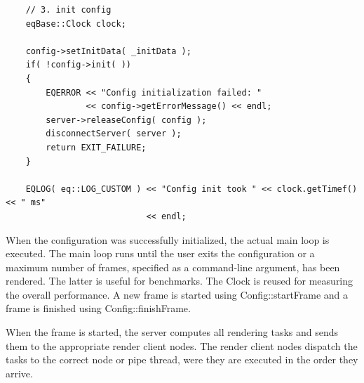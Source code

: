 \documentclass[10pt,a4]{scrartcl}
\begin{document}
{\footnotesize\begin{lstlisting}
    // 3. init config
    eqBase::Clock clock;

    config->setInitData( _initData );
    if( !config->init( ))
    {
        EQERROR << "Config initialization failed: " 
                << config->getErrorMessage() << endl;
        server->releaseConfig( config );
        disconnectServer( server );
        return EXIT_FAILURE;
    }

    EQLOG( eq::LOG_CUSTOM ) << "Config init took " << clock.getTimef() << " ms"
                            << endl;
\end{lstlisting}}%

When the configuration was successfully initialized, the actual main
loop is executed. The main loop runs until the user exits the
configuration or a maximum number of frames, specified as a command-line
argument, has been rendered. The latter is useful for benchmarks. The
\textsf{Clock} is reused for measuring the overall performance. A new
frame is started using \textsf{Config::startFrame} and a frame is
finished using \textsf{Config::finishFrame}.

When the frame is started, the server computes all rendering tasks and
sends them to the appropriate render client nodes. The render client
nodes dispatch the tasks to the correct node or pipe thread, were they
are executed in the order they arrive.
\end{document}
